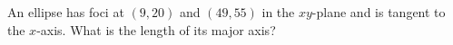 An ellipse has foci at $(9,20)$ and $(49,55)$ in the $xy$-plane and is tangent to the $x$-axis.  What is the length of its major axis?
